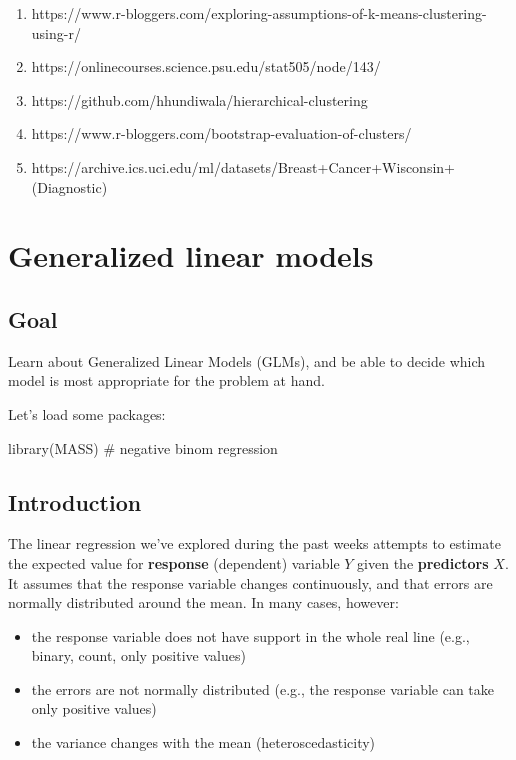 \documentclass[
  letterpaper,
  DIV=11,
  numbers=noendperiod]{scrreprt}
\newenvironment{Shaded}{\begin{snugshade}}{\end{snugshade}}
\newcommand{\NormalTok}[1]{\textcolor[rgb]{0.00,0.23,0.31}{#1}}
\providecommand{\tightlist}{%
  \setlength{\itemsep}{0pt}\setlength{\parskip}{0pt}}\usepackage{longtable,booktabs,array}
\begin{document}
\begin{enumerate}
\def\labelenumi{\arabic{enumi}.}
\tightlist
\item
  https://www.r-bloggers.com/exploring-assumptions-of-k-means-clustering-using-r/
\item
  https://onlinecourses.science.psu.edu/stat505/node/143/
\item
  https://github.com/hhundiwala/hierarchical-clustering
\item
  https://www.r-bloggers.com/bootstrap-evaluation-of-clusters/
\item
  https://archive.ics.uci.edu/ml/datasets/Breast+Cancer+Wisconsin+(Diagnostic)
\end{enumerate}


\chapter{Generalized linear models}\label{generalized-linear-models}

\section{Goal}\label{goal-4}

Learn about Generalized Linear Models (GLMs), and be able to decide
which model is most appropriate for the problem at hand.

Let's load some packages:

\begin{Shaded}
\begin{Highlighting}[]
\NormalTok{library(MASS) \# negative binom regression}
\end{Highlighting}
\end{Shaded}

\section{Introduction}\label{introduction}

The linear regression we've explored during the past weeks attempts to
estimate the expected value for \textbf{response} (dependent) variable
\(Y\) given the \textbf{predictors} \(X\). It assumes that the response
variable changes continuously, and that errors are normally distributed
around the mean. In many cases, however:

\begin{itemize}
\tightlist
\item
  the response variable does not have support in the whole real line
  (e.g., binary, count, only positive values)
\item
  the errors are not normally distributed (e.g., the response variable
  can take only positive values)
\item
  the variance changes with the mean (heteroscedasticity)
\end{itemize}
\end{document}
